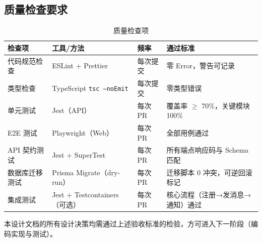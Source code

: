 \subsection{质量检查要求}

\begin{table}[H]
\centering
\caption{质量检查项}
\begin{tabularx}{\textwidth}{L{3.0cm}L{2.5cm}L{2.0cm}Y}
\toprule
\textbf{检查项} & \textbf{工具/方法} & \textbf{频率} & \textbf{通过标准} \\
\midrule
代码规范检查 & ESLint + Prettier & 每次提交 & 零 Error，警告可记录 \\
类型检查 & TypeScript \texttt{tsc --noEmit} & 每次提交 & 零类型错误 \\
单元测试 & Jest（API） & 每次 PR & 覆盖率 $\ge$ 70\%，关键模块 100\% \\
E2E 测试 & Playwright（Web） & 每次 PR & 全部用例通过 \\
API 契约测试 & Jest + SuperTest & 每次 PR & 所有端点响应码与 Schema 匹配 \\
数据库迁移测试 & Prisma Migrate（dry-run） & 每次 PR & 迁移脚本 0 冲突，可逆回滚标记 \\
集成测试 & Jest + Testcontainers（可选） & 每次 PR & 核心流程（注册→发消息→通知）通过 \\
\bottomrule
\end{tabularx}
\label{tab:quality}
\end{table}

本设计文档的所有设计决策均需通过上述验收标准的检验，方可进入下一阶段（编码实现与测试）。
